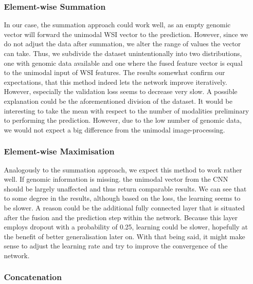 \subsubsection{Element-wise Summation}

In our case, the summation approach could work well, as an empty genomic vector will forward the unimodal WSI vector to the prediction. However, since we do not adjust the data after summation, we alter the range of values the vector can take. Thus, we subdivide the dataset unintentionally into two distributions, one with genomic data available and one where the fused feature vector is equal to the unimodal input of WSI features.
The results somewhat confirm our expectations, that this method indeed lets the network improve iteratively. However, especially the validation loss seems to decrease very slow. A possible explanation could be the aforementioned division of the dataset.
It would be interesting to take the mean with respect to the number of modalities preliminary to performing the prediction. However, due to the low number of genomic data, we would not expect a big difference from the unimodal image-processing. 

\subsubsection{Element-wise Maximisation}

Analogously to the summation approach, we expect this method to work rather well. If genomic information is missing. the unimodal vector from the CNN should be largely unaffected and thus return comparable results. We can see that to some degree in the results, although based on the loss, the learning seems to be slower. A reason could be the additional fully connected layer that is situated after the fusion and the prediction step within the network. Because this layer employs dropout with a probability of 0.25, learning could be slower, hopefully at the benefit of better generalisation later on. With that being said, it might make sense to adjust the learning rate and try to improve the convergence of the network.

\subsubsection{Concatenation}

